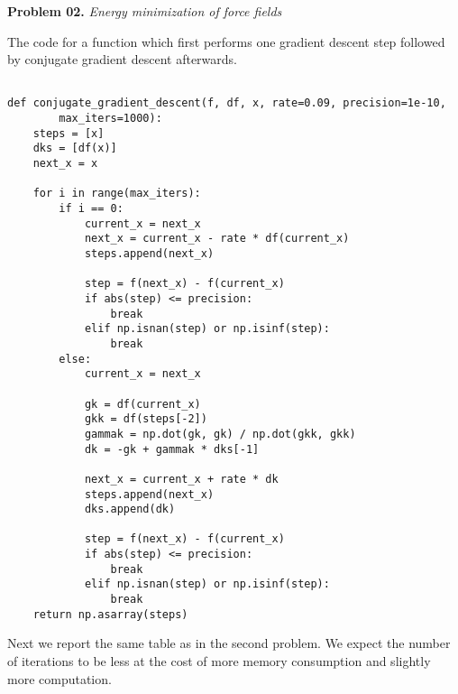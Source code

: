 \documentclass{article}
\newcommand{\exnum}{02} %
\newcounter{problem}[section]
\newenvironment{prob}[1]
{
    \refstepcounter{problem}
    \Large{\textbf{Problem \exnum.\theproblem}  \qquad \textit{#1}}
    \begin{enumerate}[label=\alph*]
    \normalsize
}{
    \end{enumerate}
}
\begin{document}
\begin{prob}{Energy minimization of force fields}
The code for a function which first performs one gradient descent step followed by conjugate gradient descent afterwards.

\begin{lstlisting}[frame=single]  % Start your code-block

def conjugate_gradient_descent(f, df, x, rate=0.09, precision=1e-10, 
		max_iters=1000):
	steps = [x]
	dks = [df(x)]
	next_x = x
	
	for i in range(max_iters):
		if i == 0:
			current_x = next_x
			next_x = current_x - rate * df(current_x)
			steps.append(next_x)
			
			step = f(next_x) - f(current_x)
			if abs(step) <= precision:
				break
			elif np.isnan(step) or np.isinf(step):
				break
		else:
			current_x = next_x
			
			gk = df(current_x)
			gkk = df(steps[-2])
			gammak = np.dot(gk, gk) / np.dot(gkk, gkk)
			dk = -gk + gammak * dks[-1]
			
			next_x = current_x + rate * dk
			steps.append(next_x)
			dks.append(dk)
			
			step = f(next_x) - f(current_x)
			if abs(step) <= precision:
				break
			elif np.isnan(step) or np.isinf(step):
				break
	return np.asarray(steps)
\end{lstlisting}

Next we report the same table as in the second problem. We expect the number of iterations to be less at the cost of more memory consumption and slightly more computation.



\end{prob}
\end{document}
